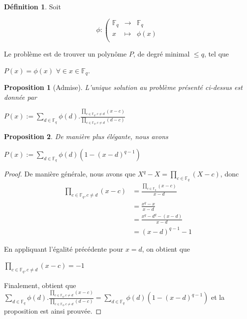 \documentclass[12pt]{article}
\newcommand{\Fq}{\mathds{F}_q}
\newcommand{\fonction}[5]{
\begin{displaymath}
#1 :
\left(
\begin{array}{rcl}
#2 & \longrightarrow &#3 \\
#4 & \longmapsto & #5 \\
\end{array}
\right.
\end{displaymath}
}
\newtheorem{prop}{Proposition}
\theoremstyle{definition}
\newtheorem{definition}{Définition}
\begin{document}
\begin{definition}
Soit
\fonction{\phi}{\Fq}{\Fq}{x}{\phi(x)}
Le problème est de trouver un polynôme $P$, de degré minimal $\le q$, tel que 
	\begin{center} $P(x) = \phi(x)$ $\forall  \in  x \in \Fq$. \end{center}
\end{definition}

\begin{prop}[Admise]
L'unique solution au problème présenté ci-dessus est donnée par 
	\begin{center} $P(x) := \displaystyle\sum_{d \in \Fq} \phi(d).\displaystyle\frac{\displaystyle\prod_{c \in \Fq, c \ne d }(x - c)}{\displaystyle\prod_{c \in \Fq, c \ne d}(d -c)}$\end{center}
\end{prop}

\begin{prop}
De manière plus élégante, nous avons
	\begin{center} $P(x) := \displaystyle \sum_{d \in \Fq } \phi(d) (1 - (x-d)^{q-1}) $ \end{center}
\end{prop}

\begin{proof}De manière générale, nous avons que $X^q - X = \displaystyle\prod_{c \in \Fq} (X-c)$, donc \newline
	\begin{align*} 
		\displaystyle\prod_{c \in \Fq, c \ne d}(x - c) &= \frac{\displaystyle\prod_{c \in \Fq}(x - c)}{x - d}\\
		 &= \displaystyle\frac{x^q - x}{x-d} \\
		 &= \displaystyle\frac{x^q - d^q - (x-d)}{x-d} \\
		 &= (x-d)^{q-1} - 1
	\end{align*}

En appliquant l'égalité précédente pour $x = d$, on obtient que \begin{center} $\displaystyle\prod_{c \in \Fq, c \ne d }(x - c) = -1$ \end{center}
Finalement, obtient que $ \displaystyle\sum_{d \in \Fq} \phi(d).\displaystyle\frac{\displaystyle\prod_{c \in \Fq, c \ne d }(x - c)}{\displaystyle\prod_{c \in \Fq, c \ne d}(d -c)} =  \displaystyle \sum_{d \in \Fq } \phi(d) (1 - (x-d)^{q-1})$ et la proposition est ainsi prouvée.
\end{proof}
\end{document}
